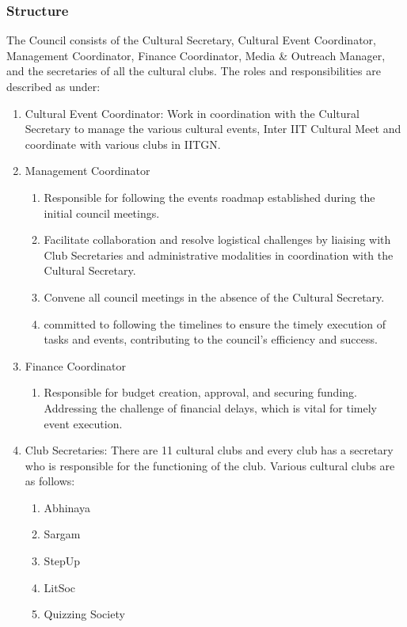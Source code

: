 \documentclass[12pt]{article}
\begin{document}
\subsubsection{Structure}
The Council consists of the Cultural Secretary, Cultural Event Coordinator, Management Coordinator, Finance Coordinator, Media \& Outreach Manager, and the secretaries of all the cultural clubs. The roles and responsibilities are described as under:
\begin{enumerate}
    \item Cultural Event Coordinator: Work in coordination with the Cultural Secretary to manage the various cultural events, Inter IIT Cultural Meet and coordinate with various clubs in IITGN.
    \item Management Coordinator
    \begin{enumerate}
        \item Responsible for following the events roadmap established during the initial council meetings.
        \item Facilitate collaboration and resolve logistical challenges by liaising with Club Secretaries and administrative modalities in coordination with the Cultural Secretary.
        \item Convene all council meetings in the absence of the Cultural Secretary.
        \item committed to following the timelines to ensure the timely execution of tasks and events, contributing to the council's efficiency and success.
    \end{enumerate}
    \item Finance Coordinator
    \begin{enumerate}
        \item Responsible for budget creation, approval, and securing funding. Addressing the challenge of financial delays, which is vital for timely event execution.
    \end{enumerate}
    \item Club Secretaries: There are 11 cultural clubs and every club has a secretary who is responsible for the functioning of the club. Various cultural clubs are as follows:
    \begin{enumerate}
        \item Abhinaya
        \item Sargam
        \item StepUp
        \item LitSoc
        \item Quizzing Society

\end{enumerate}
\end{enumerate}
\end{document}
